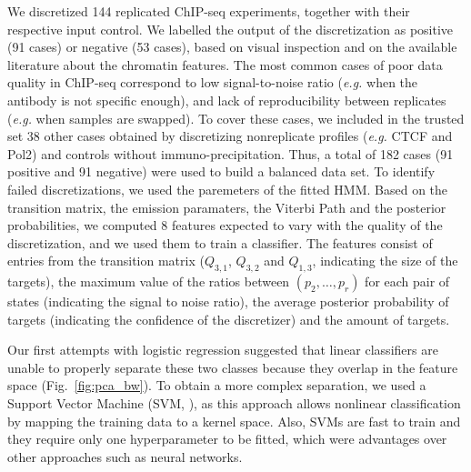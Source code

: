 \documentclass{bioinfo}
\begin{document}
\begin{methods}
We discretized 144 replicated ChIP-seq experiments, together with their
respective input control.
We labelled the output of the discretization as positive (91 cases)
or negative (53 cases), based on visual inspection and on the available
literature about the chromatin features. The most common cases of
poor data quality in ChIP-seq correspond to low signal-to-noise ratio
(\textit{e.g.} when the antibody is not specific enough), and lack of
reproducibility between replicates (\textit{e.g.} when samples are
swapped). To cover these cases, we included in the trusted set
38 other cases obtained by discretizing nonreplicate profiles
(\textit{e.g.} CTCF and Pol2) and controls without immuno-precipitation.
Thus, a total of 182 cases (91 positive and 91 negative) were used to
build a balanced data set.
To identify failed discretizations, we used the paremeters of the
fitted HMM. Based on the transition matrix, the emission paramaters,
the Viterbi Path and the posterior probabilities,
we computed 8 features expected to vary with the quality
of the discretization, and we used them to train a classifier.
The features consist of entries from the transition matrix ($Q_{3,1}$,
$Q_{3,2}$ and $Q_{1,3}$, indicating the size of the targets), the
maximum value of the ratios between $(p_2, \ldots, p_r)$ for each
pair of states (indicating the signal to noise ratio), the average
posterior probability of targets (indicating the confidence of the
discretizer) and the amount of targets.

Our first attempts with logistic regression suggested that linear
classifiers are unable to properly separate these two classes because
they overlap in the feature space (Fig.~\ref{fig:pca_bw}). To obtain a
more complex separation, we used a Support Vector Machine
(SVM, \citealp{Chang2011,e1071}), as this approach
allows nonlinear classification by mapping
the training data to a kernel space. Also, SVMs are fast to train and
they require only one hyperparameter to be fitted, which were
advantages over other approaches such as neural networks.


\end{methods}
\end{document}
